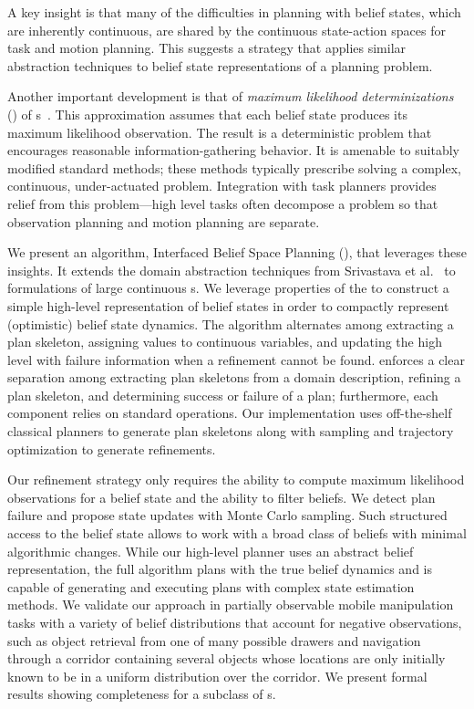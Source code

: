 A key insight is that many of the difficulties in planning with belief
states, which are inherently continuous, are shared by the continuous
state-action spaces for task and motion planning. This suggests a
strategy that applies similar abstraction techniques to belief state
representations of a planning problem.

Another important development is that of \emph{maximum likelihood
  determinizations} (\mld) of \pomdp s~\cite{platt2010belief}. This
approximation assumes that each belief state produces its maximum
likelihood observation. The result is a deterministic problem that
encourages reasonable information-gathering behavior. It is amenable
to suitably modified standard methods; these methods typically
prescribe solving a complex, continuous, under-actuated
problem. Integration with task planners provides relief from this
problem---high level tasks often decompose a problem so that
observation planning and motion planning are separate.

We present an algorithm, Interfaced Belief Space Planning (\ibsp),
that leverages these insights. It extends the domain abstraction
techniques from Srivastava et al.~\cite{srivastava2014combined} to
\mld{} formulations of large continuous \pomdp s. We leverage properties
of the \mld{} to construct a simple high-level representation of belief
states in order to compactly represent (optimistic) belief state dynamics. The algorithm alternates among extracting a plan
skeleton, assigning values to continuous variables, and updating the
high level with failure information when a refinement cannot be found.
\ibsp{} enforces a clear separation among extracting plan skeletons
from a domain description, refining a plan skeleton, and determining
success or failure of a plan; furthermore, each component relies on
standard operations. Our implementation uses off-the-shelf classical
planners to generate plan skeletons along with sampling and trajectory
optimization to generate refinements.

Our refinement strategy only requires the ability to compute maximum
likelihood observations for a belief state and the ability to filter
beliefs. We detect plan failure and propose state updates with Monte Carlo
sampling. Such structured access to the belief state allows \ibsp{} to work with a broad class
of beliefs with minimal algorithmic changes. While our high-level
planner uses an abstract belief representation, the full algorithm
plans with the true belief dynamics and is capable of generating and executing plans
with complex state estimation methods. We validate our approach in
partially observable mobile manipulation tasks with a variety of
belief distributions that account for negative observations, such as object retrieval from
one of many possible drawers and navigation through a corridor containing several objects
whose locations are only initially known to be in a uniform distribution over the corridor. We
present formal results showing completeness for a subclass of \pomdp s.

